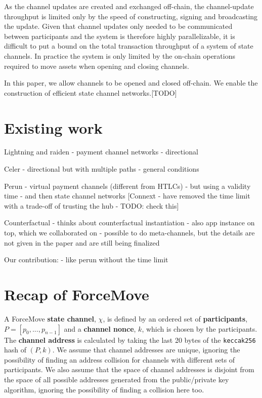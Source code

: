 \documentclass{article}
\theoremstyle{definition}
\begin{document}
As the channel updates are created and exchanged off-chain, the channel-update throughput is limited only by the speed of constructing, signing and broadcasting the update.
Given that channel updates only needed to be communicated between participants and the system is therefore highly parallelizable, it is difficult to put a bound on the total transaction throughput of a system of state channels.
In practice the system is only limited by the on-chain operations required to move assets when opening and closing channels.

In this paper, we allow channels to be opened and closed off-chain. We enable the construction of efficient state channel networks.[TODO]

\section{Existing work}

Lightning and raiden
- payment channel networks
- directional

Celer
- directional but with multiple paths
- general conditions

Perun
- virtual payment channels (different from HTLCs)
- but using a validity time
- and then state channel networks
[Connext - have removed the time limit with a trade-off of trusting the hub - TODO: check this]

Counterfactual
- thinks about counterfactual instantiation
- also app instance on top, which we collaborated on
- possible to do meta-channels, but the details are not given in the paper and are still being finalized


Our contribution:
- like perun without the time limit


\section{Recap of ForceMove}


A ForceMove \textbf{state channel}, $\chi$, is defined by an ordered set of \textbf{participants}, $P = [p_0, ..., p_{n-1}]$ and a \textbf{channel nonce}, $k$, which is chosen by the participants.
The \textbf{channel address} is calculated by taking the last 20 bytes of the \texttt{keccak256}
hash of $(P, k)$.
We assume that channel addresses are unique, ignoring the possibility of finding an address
collision for channels with different sets of participants. 
We also assume that the space of channel addresses is disjoint from the space of all possible addresses generated from the public/private key algorithm, ignoring
the possibility of finding a collision here too.
\end{document}

